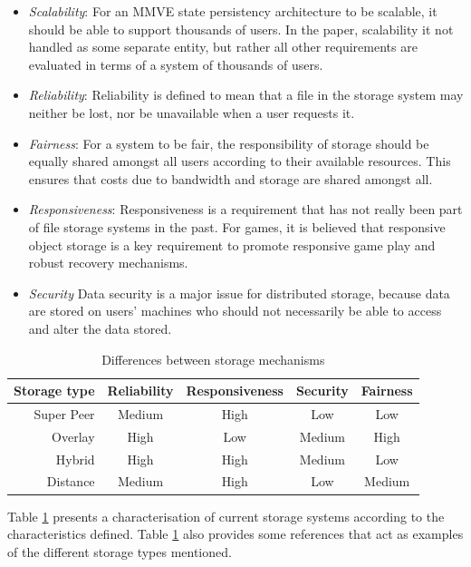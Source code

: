 \documentclass[10pt,a4paper,conference]{IEEEtran}
\begin{document}
\begin{itemize}
\item \emph{Scalability}: For an MMVE state persistency architecture to be scalable, it should be able to support thousands of users. In the
    paper, scalability it not handled as some separate entity, but rather all other requirements are evaluated in terms of a system of thousands
    of users.

\item \emph{Reliability}: Reliability is defined to mean that a file in the storage system may neither be lost, nor be unavailable when a user
    requests it.

\item \emph{Fairness}: For a system to be fair, the responsibility of storage should be equally shared amongst all users according to their
    available resources. This ensures that costs due to bandwidth and storage are shared amongst all.

\item \emph{Responsiveness}: Responsiveness is a requirement that has not really been part of file storage systems in the past. For games, it is
    believed that responsive object storage is a key requirement to promote responsive game play and robust recovery mechanisms.

\item \emph{Security} Data security is a major issue for distributed storage, because data are stored on users' machines who should not
    necessarily be able to access and alter the data stored.
\end{itemize}

\begin{table}[htbp]
\centering
\begin{tabular}{|r|c|c|c|c|}
\hline
Storage type & Reliability & Responsiveness & Security & Fairness\\
\hline
Super Peer & Medium & High & Low & Low\\
Overlay & High & Low & Medium & High\\
Hybrid & High & High & Medium & Low\\
Distance & Medium & High & Low & Medium\\
\hline
\end{tabular}
\caption{Differences between storage mechanisms} \label{tab_storage}
\end{table}
%
Table \ref{tab_storage} presents a characterisation of current storage systems according to the characteristics defined. Table \ref{tab_storage} also
provides some references that act as examples of the different storage types mentioned.
\end{document}
